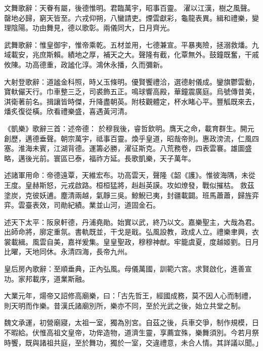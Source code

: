 \begin{pinyinscope}
 文舞歌辭：天眷有屬，後德惟明。君臨萬宇，昭事百靈。
 濯以江漢，樹之風聲。罄地必歸，窮天皆至。六戎仰朔，八蠻請吏。煙雲獻彩，龜龍表異。緝和禮樂，變理陰陽。功由舞見，德以歌彰。兩儀同大，日月齊光。



 武舞歌辭：惟皇御宇，惟帝乘乾。五材並用，七德兼宣。平暴夷險，拯溺救燔。九域載安，兆庶斯賴。績地之厚，補天之大。聲隆有截，化覃無外。鼓鐘既奮，干戚攸陳。功高德重，政謐化淳。鴻休永播，久而彌新。



 大射登歌辭：道謐金科照，時乂玉條明。優賢饗禮洽，選德射儀成。鑾旗鬱雲動，寶軑儼天行。巾車整三乏，司裘飾五正。鳴球響高殿，華鐘震廣庭。烏號傳昔美，淇衛著前名。揖讓皆時傑，升降盡朝英。附枝觀體定，杯水睹心平。豐觚既來去，燔炙復從橫。欣看禮樂盛，喜遇黃河清。



 《凱樂》歌辭三首：述帝德：
 於穆我後，睿哲欽明。膺天之命，載育群生。開元創歷，邁德垂聲。朝宗萬宇，祗事百靈。煥乎皇道，昭哉帝則。惠政滂流，仁風四塞。淮海未賓，江湖背德。運籌必勝，濯征斯克。八荒務卷，四表雲褰。雄圖盛略，邁後光前。寰區已泰，福祚方延。長歌凱樂，天子萬年。



 述諸軍用命：帝德遠覃，天維宏布。功高雲天，聲隆《韶《護》。惟彼海隅，未從王度。皇赫斯怒，元戎啟路。桓桓猛將，赳赳英謨。攻如燎發，戰似摧枯。
 救茲塗炭，克彼妖逋。塵清兩越，氣靜三吳。鯨鯢已夷，封疆載闢。班馬蕭蕭，歸旌弈弈。雲臺表效，司勛紀績。業並山河，道固金石。



 述天下太平：阪泉軒德，丹浦堯勛。始實以武，終乃以文。嘉樂聖主，大哉為君。出師命將，廓定重氛。書軌既並，干戈是戢。弘風設教，政成人立。禮樂聿興，衣裳載緝。風雲自美，嘉祥爰集。皇皇聖政，穆穆神猷。牢籠虞夏，度越姬劉。日月比曜，天地同休。永清四海，長帝九州。



 皇后房內歌辭：至順垂典，正內弘風。母儀萬國，訓範六宮。求賢啟化，進善宣功。家邦載序，道業斯融。



 大業元年，煬帝又詔修高廟樂，曰：「古先哲王，經國成務，莫不因人心而制禮，則天明而作樂。昔漢氏諸廟別所，樂亦不同，至於光武之後，始立共堂之制。



 魏文承運，初營廟寢，太祖一室，獨為別宮。自茲之後，兵車交爭，制作規模，日不暇給。伏惟高祖文皇帝，功侔造物，道濟生靈，享薦宜殊，樂舞須別。今若月祭時饗，既與諸祖共庭，至於舞功，獨於一室，交違禮意，未合人情。其詳議以聞。」




\end{pinyinscope}
